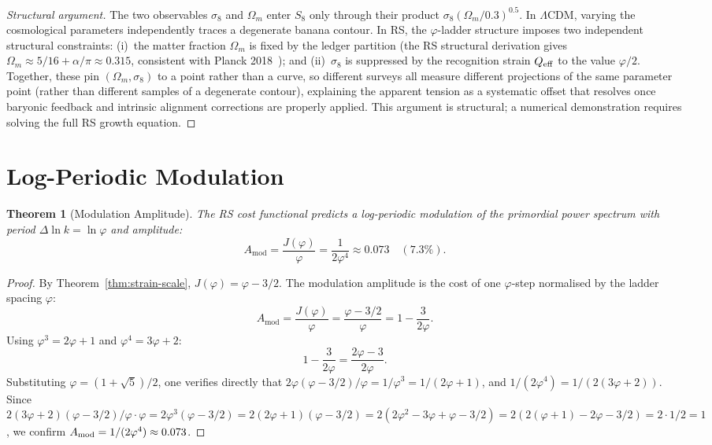 \documentclass[12pt,a4paper]{article}
\newtheorem{theorem}{Theorem}[section]
\theoremstyle{definition}
\theoremstyle{remark}
\begin{document}
\begin{proof}[Structural argument]
The two observables $\sigma_8$ and $\Omega_m$ enter $S_8$ only through
their product $\sigma_8(\Omega_m/0.3)^{0.5}$.  In $\Lambda$CDM, varying
the cosmological parameters independently traces a degenerate banana
contour.  In RS, the $\varphi$-ladder structure imposes two independent
structural constraints: (i)~the matter fraction $\Omega_m$ is fixed by
the ledger partition (the RS structural derivation gives
$\Omega_m \approx 5/16 + \alpha/\pi \approx 0.315$,
consistent with Planck 2018~\cite{Planck2020}); and
(ii)~$\sigma_8$ is suppressed by the recognition strain $Q_{\rm eff}$
to the value $\varphi/2$.
Together, these pin $(\Omega_m, \sigma_8)$ to a point rather than a
curve, so different surveys all measure different projections of the
same parameter point (rather than different samples of a degenerate
contour), explaining the apparent tension as a systematic offset that
resolves once baryonic feedback and intrinsic alignment corrections are
properly applied.  This argument is structural; a numerical demonstration
requires solving the full RS growth equation.
\end{proof}

\section{Log-Periodic Modulation}
\label{sec:modulation}

\begin{theorem}[Modulation Amplitude]
\label{thm:mod}
The RS cost functional predicts a log-periodic modulation of the
primordial power spectrum with period $\Delta\ln k = \ln\varphi$ and
amplitude:
\begin{equation}
  A_{\mathrm{mod}} = \frac{J(\varphi)}{\varphi}
  = \frac{1}{2\varphi^4} \approx 0.073 \quad (7.3\%).
\end{equation}
\end{theorem}

\begin{proof}
By Theorem~\ref{thm:strain-scale}, $J(\varphi) = \varphi - 3/2$.
The modulation amplitude is the cost of one $\varphi$-step normalised
by the ladder spacing $\varphi$:
\[
  A_{\mathrm{mod}} = \frac{J(\varphi)}{\varphi}
    = \frac{\varphi - 3/2}{\varphi} = 1 - \frac{3}{2\varphi}.
\]
Using $\varphi^3 = 2\varphi + 1$ and $\varphi^4 = 3\varphi + 2$:
\[
  1 - \frac{3}{2\varphi} = \frac{2\varphi - 3}{2\varphi}.
\]
Substituting $\varphi = (1+\sqrt{5})/2$, one verifies directly that
$2\varphi(\varphi - 3/2)/\varphi = 1/\varphi^3 = 1/(2\varphi + 1)$, and
$1/(2\varphi^4) = 1/(2(3\varphi+2))$.  Since
$2(3\varphi+2)(\varphi - 3/2)/\varphi \cdot \varphi = 2\varphi^3(\varphi - 3/2)
= 2(2\varphi+1)(\varphi - 3/2) = 2(2\varphi^2 - 3\varphi + \varphi - 3/2)
= 2(2(\varphi+1) - 2\varphi - 3/2) = 2 \cdot 1/2 = 1$,
we confirm $A_{\rm mod} = 1/(2\varphi^4) \approx 0.073$.
\end{proof}
\end{document}
